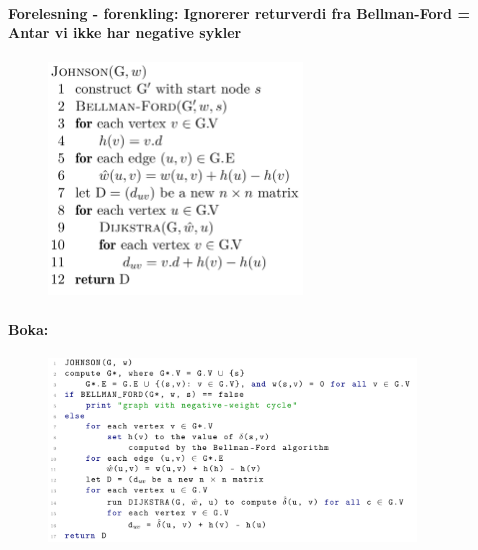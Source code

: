 \documentclass[12pt]{report}
\begin{document}
\vspace{\baselineskip}
\begin{multicols}{2}
\paragraph*{Forelesning - forenkling: Ignorerer returverdi fra Bellman-Ford = Antar vi ikke har negative sykler}



\begin{figure}[H]
	\begin{Center}
		\includegraphics[width=2.66in,height=2.44in]{./media/image132.png}
	\end{Center}
\end{figure}



\paragraph*{ }

\vspace{\baselineskip}
\paragraph*{Boka:}



\begin{figure}[H]
	\begin{Center}
		\includegraphics[width=3.85in,height=1.92in]{./media/image133.png}
	\end{Center}
\end{figure}



\end{multicols}
\end{document}
